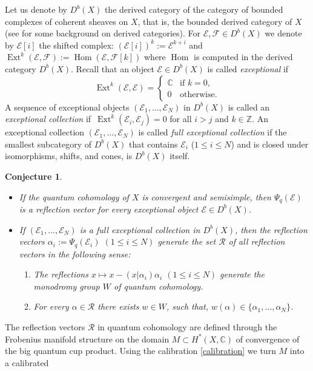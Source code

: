 \documentclass[10pt,a4paper]{article}
\numberwithin{equation}{section}
\newtheorem{Conjecture}[Theorem]{Conjecture}
 { \theoremstyle{definition}
\newtheorem{Definition}[Theorem]{Definition}
\newtheorem{Note}[Theorem]{Note}
\newtheorem{Example}[Theorem]{Example}
\newtheorem{Remark}[Theorem]{Remark} }
\newcommand{\CC}{\mathbb{C}}
\newcommand{\ZZ}{\mathbb{Z}}
\newcommand{\F}{\mathcal{F}}
\newcommand{\E}{\mathcal{E}}
\begin{document}
Let us denote by $D^b(X)$
the derived category of the category of bounded complexes of coherent
sheaves on $X$, that is, the bounded derived category of $X$ (see
\cite{GM} for some background on derived categories). For $\E, \F \in
D^b(X)$ we denote by $\E[i]$ the shifted complex:
$(\E[i])^k:=\E^{k+i}$ and
$
\operatorname{Ext}^k(\E,\F):=\operatorname{Hom}(\E,\F[k])
$
where $\operatorname{Hom}$ is computed in the derived category
$D^b(X)$. Recall that an object $\E\in D^b(X)$ is called {\em
 exceptional} if
\[
\operatorname{Ext}^k(\E,\E)=
\begin{cases}
 \CC & \mbox{if } k=0,\\
 0 & \mbox{otherwise}.
\end{cases}
\]
A sequence of exceptional objects $(\E_1,\dots,\E_N)$ in $D^b(X)$ is called an
{\em exceptional collection} if~$\operatorname{Ext}^k(\E_i,\E_j)=0$
for all $i>j$ and $k\in \ZZ$. An exceptional collection
$(\E_1,\dots,\E_N)$ is called {\em full exceptional collection} if the
smallest subcategory of $D^b(X)$ that
contains $\E_i$ ($1\leq i\leq N$) and is closed under isomorphisms,
shifts, and cones, is $D^b(X)$ itself.
\begin{Conjecture}\label{conj:rv}\quad
\begin{itemize}\itemsep=0pt
\item[$(a)$] If the quantum cohomology of $X$ is convergent and semisimple,
 then $\Psi_q(\E)$ is a reflection vector for every exceptional
 object $\E\in D^b(X)$.
\item[$(b)$] If $(\E_1,\dots, \E_N)$ is a full exceptional collection in
 $D^b(X)$, then the reflection vectors $\alpha_i:=\Psi_q(\E_i)$
 $(1\leq i\leq N)$ generate the set $\mathcal{R}$ of all reflection
 vectors in the following sense:
 \begin{enumerate}\itemsep=0pt
 \item[$(i)$]
 The reflections $x\mapsto x-(x|\alpha_i) \alpha_i$ $(1\leq i\leq
 N)$ generate the monodromy group $W$ of quantum cohomology.
 \item[$(ii)$]
 For every $\alpha\in \mathcal{R}$ there exists $w\in W$, such
 that, $w(\alpha) \in \{\alpha_1,\dots,\alpha_N\}$.
 \end{enumerate}
 \end{itemize}
 \end{Conjecture}
The reflection vectors $\mathcal{R}$ in quantum cohomology are defined
through the Frobenius manifold structure on the domain $M\subset
H^*(X,\CC)$ of convergence of the big quantum cup product. Using the
calibration \eqref{calibration} we turn $M$ into a calibrated
\end{document}
